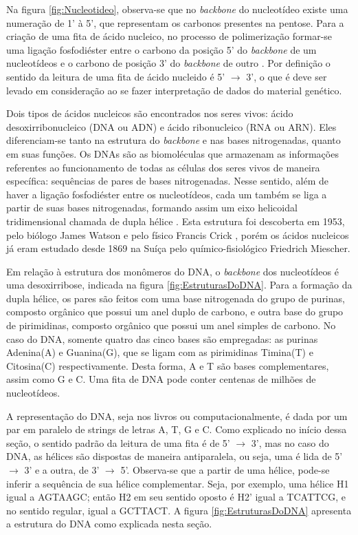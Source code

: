 \indent Na figura \ref{fig:Nucleotideo}, observa-se que no \textit{backbone} do nucleotídeo existe uma numeração de 1' à 5', que representam os carbonos presentes na pentose. Para a criação de uma fita de ácido nucleico, no processo de polimerização formar-se uma ligação fosfodiéster entre o carbono da posição 5' do \textit{backbone} de um nucleotídeos e o carbono de posição 3' do \textit{backbone} de outro \cite{setubal97}. Por definição o sentido da leitura de uma fita de ácido nucleido é 5' $\rightarrow$ 3', o que é deve ser levado em consideração ao se fazer interpretação de dados do material genético.

\indent Dois tipos de ácidos nucleicos são encontrados nos seres vivos: ácido desoxirribonucleico (DNA ou ADN) e ácido ribonucleico (RNA ou ARN). Eles diferenciam-se tanto na estrutura do \textit{backbone} e nas bases nitrogenadas, quanto em suas funções. Os DNAs são as biomoléculas que armazenam as informações referentes ao funcionamento de todas as células dos seres vivos de maneira específica: sequências de pares de bases nitrogenadas. Nesse sentido, além de haver a ligação fosfodiéster entre os nucleotídeos, cada um também se liga a partir de suas bases nitrogenadas, formando assim um eixo helicoidal tridimensional chamada de dupla hélice \cite{setubal97}. Esta estrutura foi descoberta em 1953, pelo biólogo James Watson e pelo físico Francis Crick \cite{dnadiscovery08}, porém os ácidos nucleicos já eram estudado desde 1869 na Suíça pelo químico-fisiológico Friedrich Miescher.

\indent Em relação à estrutura dos monômeros do DNA, o \textit{backbone} dos nucleotídeos é uma desoxirribose, indicada na figura \ref{fig:EstruturasDoDNA}. Para a formação da dupla hélice, os pares são feitos com uma base nitrogenada do grupo de purinas, composto orgânico que possui um anel duplo de carbono, e outra base do grupo de pirimidinas, composto orgânico que possui um anel simples de carbono. No caso do DNA, somente quatro das cinco bases são empregadas: as purinas Adenina(A) e Guanina(G), que se ligam com as pirimidinas Timina(T) e Citosina(C) respectivamente. Desta forma, A e T são bases complementares, assim como G e C. Uma fita de DNA pode conter centenas de milhões de nucleotídeos.

\indent A representação do DNA, seja nos livros ou computacionalmente, é dada por um par em paralelo de strings de letras A, T, G e C. Como explicado no início dessa seção, o sentido padrão da leitura de uma fita é de 5' $\rightarrow$ 3', mas no caso do DNA, as hélices são dispostas de maneira antiparalela, ou seja, uma é lida de 5' $\rightarrow$ 3' e a outra, de 3' $\rightarrow$ 5'. Observa-se que a partir de uma hélice, pode-se inferir a sequência de sua hélice complementar. Seja, por exemplo, uma hélice H1 igual a AGTAAGC; então H2 em seu sentido oposto é H2' igual a TCATTCG, e no sentido regular, igual a GCTTACT. A figura \ref{fig:EstruturasDoDNA} apresenta a estrutura do DNA como explicada nesta seção.

